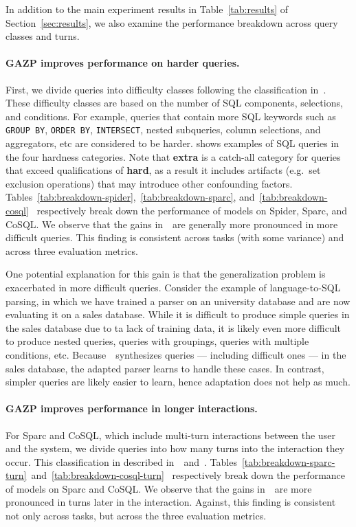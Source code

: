 \documentclass[11pt,a4paper]{article}
\begin{document}
In addition to the main experiment results in Table~\ref{tab:results} of Section~\ref{sec:results}, we also examine the performance breakdown across query classes and turns.

\paragraph{GAZP improves performance on harder queries.}
First, we divide queries into difficulty classes following the classification in~\citet{yu2018spider}.
These difficulty classes are based on the number of SQL components, selections, and conditions.
For example, queries that contain more SQL keywords such as \texttt{GROUP BY}, \texttt{ORDER BY}, \texttt{INTERSECT}, nested subqueries, column selections, and aggregators, etc are considered to be harder.
\citet{yu2018spider} shows examples of SQL queries in the four hardness categories.
Note that \textbf{extra} is a catch-all category for queries that exceed qualifications of \textbf{hard}, as a result it includes artifacts (e.g.~set exclusion operations) that may introduce other confounding factors.
Tables~\ref{tab:breakdown-spider},~\ref{tab:breakdown-sparc}, and~\ref{tab:breakdown-cosql}~ respectively break down the performance of models on Spider, Sparc, and CoSQL.
We observe that the gains in~\modelnameshort~are generally more pronounced in more difficult queries.
This finding is consistent across tasks (with some variance) and across three evaluation metrics.

One potential explanation for this gain is that the generalization problem is exacerbated in more difficult queries.
Consider the example of language-to-SQL parsing, in which we have trained a parser on an university database and are now evaluating it on a sales database.
While it is difficult to produce simple queries in the sales database due to ta lack of training data, it is likely even more difficult to produce nested queries, queries with groupings, queries with multiple conditions, etc.
Because~\modelnameshort~synthesizes queries --- including difficult ones --- in the sales database, the adapted parser learns to handle these cases.
In contrast, simpler queries are likely easier to learn, hence adaptation does not help as much.



\paragraph{GAZP improves performance in longer interactions.}
For Sparc and CoSQL, which include multi-turn interactions between the user and the system, we divide queries into how many turns into the interaction they occur.
This classification in described in~\citet{yu2019sparc}~and~\citet{yu2019cosql}.
Tables~\ref{tab:breakdown-sparc-turn}~and~\ref{tab:breakdown-cosql-turn}~ respectively break down the performance of models on Sparc and CoSQL.
We observe that the gains in~\modelnameshort~are more pronounced in turns later in the interaction.
Against, this finding is consistent not only across tasks, but across the three evaluation metrics.
\end{document}

